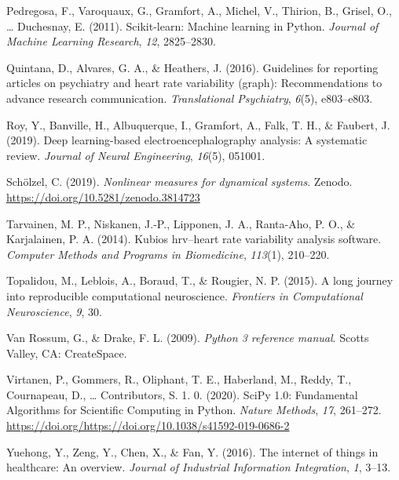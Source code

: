 \documentclass[
  english,
  man,floatsintext]{apa6}
\begin{document}
\leavevmode\hypertarget{ref-scikit-learn}{}%
Pedregosa, F., Varoquaux, G., Gramfort, A., Michel, V., Thirion, B., Grisel, O., \ldots{} Duchesnay, E. (2011). Scikit-learn: Machine learning in Python. \emph{Journal of Machine Learning Research}, \emph{12}, 2825--2830.

\leavevmode\hypertarget{ref-Quintana2016}{}%
Quintana, D., Alvares, G. A., \& Heathers, J. (2016). Guidelines for reporting articles on psychiatry and heart rate variability (graph): Recommendations to advance research communication. \emph{Translational Psychiatry}, \emph{6}(5), e803--e803.

\leavevmode\hypertarget{ref-roy2019deep}{}%
Roy, Y., Banville, H., Albuquerque, I., Gramfort, A., Falk, T. H., \& Faubert, J. (2019). Deep learning-based electroencephalography analysis: A systematic review. \emph{Journal of Neural Engineering}, \emph{16}(5), 051001.

\leavevmode\hypertarget{ref-nolds}{}%
Schölzel, C. (2019). \emph{Nonlinear measures for dynamical systems}. Zenodo. \url{https://doi.org/10.5281/zenodo.3814723}

\leavevmode\hypertarget{ref-tarvainen2014kubios}{}%
Tarvainen, M. P., Niskanen, J.-P., Lipponen, J. A., Ranta-Aho, P. O., \& Karjalainen, P. A. (2014). Kubios hrv--heart rate variability analysis software. \emph{Computer Methods and Programs in Biomedicine}, \emph{113}(1), 210--220.

\leavevmode\hypertarget{ref-topalidou2015long}{}%
Topalidou, M., Leblois, A., Boraud, T., \& Rougier, N. P. (2015). A long journey into reproducible computational neuroscience. \emph{Frontiers in Computational Neuroscience}, \emph{9}, 30.

\leavevmode\hypertarget{ref-python3}{}%
Van Rossum, G., \& Drake, F. L. (2009). \emph{Python 3 reference manual}. Scotts Valley, CA: CreateSpace.

\leavevmode\hypertarget{ref-scipy}{}%
Virtanen, P., Gommers, R., Oliphant, T. E., Haberland, M., Reddy, T., Cournapeau, D., \ldots{} Contributors, S. 1. 0. (2020). SciPy 1.0: Fundamental Algorithms for Scientific Computing in Python. \emph{Nature Methods}, \emph{17}, 261--272. \url{https://doi.org/https://doi.org/10.1038/s41592-019-0686-2}

\leavevmode\hypertarget{ref-yuehong2016internet}{}%
Yuehong, Y., Zeng, Y., Chen, X., \& Fan, Y. (2016). The internet of things in healthcare: An overview. \emph{Journal of Industrial Information Integration}, \emph{1}, 3--13.

\endgroup
\end{document}
